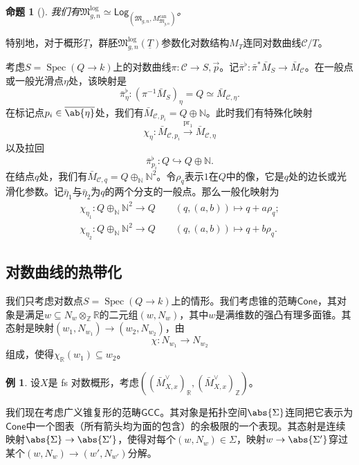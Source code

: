 \documentclass{amsart}
\newtheorem{prop}[thm]{命题}
\theoremstyle{definition}
\newtheorem{exm}[thm]{例}
\theoremstyle{remark}
\theoremstyle{plain}
\theoremstyle{definition}
\theoremstyle{remark}
\newcommand{\N}{\mathbb{N}}
\newcommand{\R}{\mathbb{R}}
\newcommand{\Z}{\mathbb{Z}}
\newcommand{\mc}[1]{\mathcal{#1}}
\newcommand{\mf}[1]{\mathfrak{#1}}
\newcommand{\on}[1]{\operatorname{#1}}
\newcommand{\ms}[1]{\mathsf{#1}}
\newcommand{\ol}[1]{\overline{#1}}
\newcommand{\ul}[1]{\underline{#1}}
\newcommand{\1}{\mathbf{1}}
\newcommand{\2}{\mathbf{2}}
\newcommand{\3}{\mathbf{3}}
\DeclareMathOperator{\Spec}{Spec}
\begin{document}
\begin{prop}[{\cite{FKato2000,Olsson2003}}]
    我们有\(\mf{M}_{g,n}^{\log} \simeq \ms{Log}_{(\mf{M}_{g,n}, M_{\mf{M}_{g,n}}^{\on{can}})}\)。
\end{prop}

特别地，对于概形\(\ul{T}\)，群胚\(\mf{M}_{g,n}^{\log}(\ul{T})\)参数化对数结构\(M_T\)连同对数曲线\(\mc{C} / T\)。

考虑\(S = \Spec (Q \to k)\)上的对数曲线\(\pi \colon \mc{C} \to S, \vec{p}\)。记\(\bar{\pi}^{\flat} \colon \bar{\pi}^* \bar{M}_S \to \bar{M}_{\mc{C}}\)。在一般点或一般光滑点\(\eta\)处，该映射是
\[ \bar{\pi}_{\eta}^{\flat} \colon (\pi^{-1} \bar{M}_S)_{\eta} = Q \simeq \bar{M}_{\mc{C}, \eta}. \]
在标记点\(p_i \in \ol{\ab\{\eta\}}\)处，我们有\(\bar{M}_{\mc{C}, p_i} = Q \oplus \N\)。此时我们有特殊化映射
\[ \chi_{\eta} \colon \bar{M}_{\mc{C}, p_i} \xrightarrow{\on{pr}_1} \bar{M}_{\mc{C}, \eta} \]
以及拉回
\[ \bar{\pi}_{p_i}^{\flat} \colon Q \hookrightarrow Q \oplus \N. \]
在结点\(q\)处，我们有\(\bar{M}_{\mc{C}, q} = Q \oplus_{\N} \N^2\)。令\(\rho_q\)表示\(1\)在\(Q\)中的像，它是\(q\)处的边长或光滑化参数。记\(\bar{\eta}_1\)与\(\bar{\eta}_2\)为\(q\)的两个分支的一般点。那么一般化映射为
\begin{align*}
    \chi_{\eta_1} \colon Q \oplus_{\N} \N^2 \to Q \qquad (q, (a,b)) \mapsto q + a \rho_q ;\\
    \chi_{\eta_2} \colon Q \oplus_{\N} \N^2 \to Q \qquad (q, (a,b)) \mapsto q + b \rho_q .
\end{align*}

\subsection{对数曲线的热带化}%
\label{sub:Tropicalization of log curves}

我们只考虑对数点\(S = \Spec(Q \to k)\)上的情形。我们考虑锥的范畴\(\ms{Cone}\)，其对象是满足\(w \subseteq N_w \otimes_{\Z} \R\)的二元组\((w, N_w)\)，其中\(w\)是满维数的强凸有理多面锥。其态射是映射\((w_1, N_{w_1}) \to (w_2, N_{w_2})\)，由
\[ \chi \colon N_{w_1} \to N_{w_2} \]
组成，使得\(\chi_{\R}(w_1) \subseteq w_2\)。

\begin{exm}
    设\(X\)是 fs 对数概形，考虑\(( (\bar{M}_{X,x}^{\vee})_{\R}, (\bar{M}_{X,x}^{\vee})_{\Z} )\)。
\end{exm}

我们现在考虑广义锥复形的范畴\(\ms{GCC}\)。其对象是拓扑空间\(\abs{\Sigma}\)连同把它表示为\(\ms{Cone}\)中一个图表（所有箭头均为面的包含）的余极限的一个表现。其态射是连续映射\(\abs{\Sigma} \to \abs{\Sigma'}\)，使得对每个\((w, N_w) \in \Sigma\)，映射\(w \to \abs{\Sigma'}\)穿过某个\((w, N_w) \to (w', N_{w'})\)分解。
\end{document}
